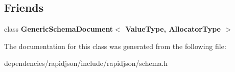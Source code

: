 \subsection*{Friends}
\begin{DoxyCompactItemize}
\item 
\mbox{\label{classinternal_1_1_schema_a04f1d1acd0a5a7fda069c115970d52b3}} 
class {\bfseries Generic\+Schema\+Document$<$ Value\+Type, Allocator\+Type $>$}
\end{DoxyCompactItemize}


The documentation for this class was generated from the following file\+:\begin{DoxyCompactItemize}
\item 
dependencies/rapidjson/include/rapidjson/schema.\+h\end{DoxyCompactItemize}
